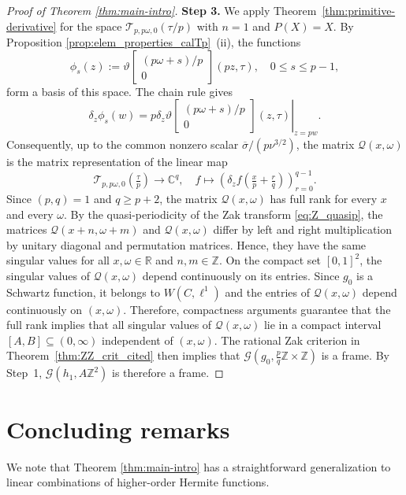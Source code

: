 \documentclass[reqno,a4paper,12pt]{amsart}
\numberwithin{equation}{section}
\newcommand{\Z}{\mathbb Z}
\newcommand{\R}{\mathbb R}
\newcommand{\C}{\mathbb C}
\newcommand{\calT}{\mathcal T}
\newcommand{\calG}{\mathcal G}
\newcommand{\dd}{\delta}
\newcommand{\QQ}{\mathcal{Q}}
\newcommand{\thetac}[2]{{\vartheta\left[\begin{smallmatrix}
        #1 \\ #2
    \end{smallmatrix}\right]}}
\begin{document}
\begin{proof}[Proof of Theorem \ref{thm:main-intro}]
\textbf{Step 3.}
We apply 
Theorem~\ref{thm:primitive-derivative} for the space $\calT_{p,p\omega,0}(\tau/p)$ with $n=1$ and $P(X)=X$. By Proposition \ref{prop:elem_properties_calTp}~(ii), the functions
\begin{equation}
\phi_s(z):=\thetac{(p\omega+s)/p}{0}(pz,\tau),\quad 0\leq s\leq p-1,
\end{equation}
form a basis of this space.  
The chain rule gives
\begin{equation}
\dd_z \phi_s(w)
=p\left.\dd_z\thetac{(p\omega+s)/p}{0}(z,\tau)\right|_{z=pw}.
\end{equation}
Consequently, up to the common nonzero scalar
$\overline\sigma/(p\nu^{3/2})$, 
the matrix $\QQ(x,\omega)$ is the matrix
representation of the linear map
\begin{equation}
    \calT_{p,p\omega,0}(\tfrac{\tau}{p})\to \C^{q},\quad f\mapsto
\left(\dd_z f\left(\tfrac{x}{p}+\tfrac{r}{q}\right)\right)_{r=0}^{q-1}.
\end{equation}
Since $(p,q)=1$ and
$q\geq p+2$, the matrix $\QQ(x,\omega)$ has full rank for every $x$ and every
$\omega$.  
By the quasi-periodicity of the Zak transform \eqref{eq:Z_quasip}, the matrices
$\QQ(x+n,\omega+m)$ and $\QQ(x,\omega)$ differ by left and right
multiplication by unitary diagonal and permutation matrices. Hence, they have
the same singular values for all $x,\omega\in\R$ and $n,m\in\Z$.
On the compact set $[0,1]^2$, the singular values of $\QQ(x,\omega)$ depend continuously on its entries. 
Since $g_0$ is a Schwartz function, it belongs to $W(C,\ell^1)$ and the entries of $\QQ(x,\omega)$ depend continuously on $(x,\omega)$.
Therefore, compactness arguments guarantee that the full rank implies that all singular values of $\QQ(x,\omega)$ lie in a compact interval $[A,B]\subseteq(0,\infty)$ independent of $(x,\omega)$.
The rational Zak criterion in
Theorem~\ref{thm:ZZ_crit_cited} then implies that
$\calG(g_0,\tfrac{p}{q}\Z\times \Z)$ is a frame. By Step~1,
$\calG(h_1,A \Z^2)$ is therefore a frame.
\end{proof}

\section{Concluding remarks}\label{sec:conclusion}

We note that Theorem \ref{thm:main-intro} has a straightforward generalization to linear combinations of higher-order Hermite functions.
\end{document}
